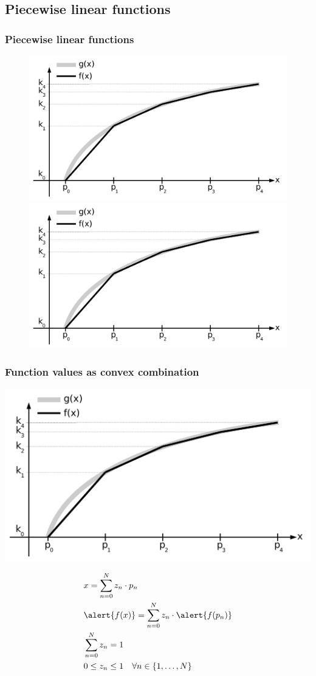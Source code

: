 \subsection{Piecewise linear functions}
\begin{frame}
 \frametitle{Piecewise linear functions}
 \begin{figure}
  \centering
  \includegraphics<1>[width=\linewidth,page=1]{Bilder/StueckweiseLineareFunktion1}
  \includegraphics<2>[width=\linewidth,page=2]{Bilder/StueckweiseLineareFunktion1}
 \end{figure}
\end{frame}

\begin{frame}
 \frametitle{Function values as convex combination}
 \begin{flushright}
  \includegraphics[width=.5\textwidth,page=2]{Bilder/StueckweiseLineareFunktion1}
 \end{flushright}
 \vspace{-5ex}
 \begin{align*}
  &x = \sum_{n=0}^{N} z_n\cdot p_n\\
  &\alert{f(x)} = \sum_{n=0}^{N} z_n\cdot \alert{f(p_n)}\\
  &\sum_{n=0}^N z_n = 1\\
  &0 \leq z_n \leq 1\quad\forall n\in\{1, \ldots, N\}\qquad\qquad\mbox{}
 \end{align*}
\end{frame}

